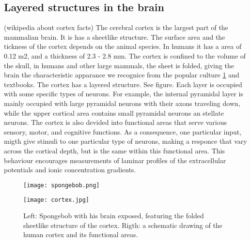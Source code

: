 \documentclass{article}
\begin{document}
\subsection{Layered structures in the brain}
(wikipedia about cortex facts)
The cerebral cortex is the largest part of the mammalian brain. It is has a sheetlike structure. The surface area and the tickness of the cortex depends on the animal species. In humans it has a area of 0.12 m2, and a thickness of 2.3 - 2.8 mm. The cortex is confined to the volume of the skull, in humans and other large mammals, the sheet is folded, giving the brain the characteristic apparance we recognice from the popular culture \ref{fig:spongebob} and textbooks.  The cortex has a layered structure. See figure. Each layer is occupied with some specific types of neurons. For example, the internal pyramidal layer is mainly occupied with large pyramidal neurons with their axons traveling down, while the upper cortical area contains small pyramidal neurons an stellate neurons. The cortex is also devided into functional areas that serve various sensory, motor, and cognitive functions. As a consequence, one particular input, migth give stimuli to one particular type of neurons, making a responce that vary across the cortical depth, but is the same within this functional area. This behaviour encourages measurements of laminar profiles of the extracellular potentials and ionic concentration gradients.  


\begin{figure}[!tbp]
  \centering
  \begin{minipage}[b]{0.45\textwidth}
    \texttt{[image: spongebob.png]}
  \end{minipage}
  \begin{minipage}[b]{0.45\textwidth}
    \texttt{[image: cortex.jpg]}
  \end{minipage}  
   \caption{Left: Spongebob with his brain exposed, featuring the folded sheetlike structure of the cortex. Rigth: a schematic drawing of the human cortex and its functional areas.}
  \label{fig:spongebob}
\end{figure}
\end{document}

